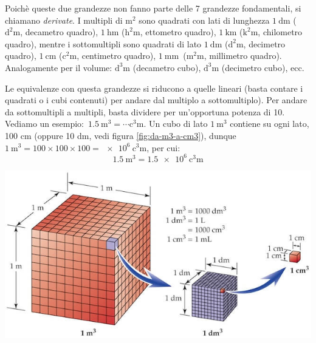 \documentclass[12pt,a4paper,oneside]{book}
\theoremstyle{esercizio}
\begin{document}
Poichè queste due grandezze non fanno parte delle 7 grandezze fondamentali, si chiamano \textit{derivate}. I multipli di \(\si{\square\meter}\) sono quadrati con lati di lunghezza \(\SI{1}{\deca\meter}\) (\(\si{\square\deca\meter}\), decametro quadro), \(\SI{1}{\hecto\meter}\) (\(\si{\square\hecto\meter}\), ettometro quadro), \(\SI{1}{\kilo\meter}\) (\(\si{\square\kilo\meter}\), chilometro quadro), mentre i sottomultipli sono quadrati di lato \(\SI{1}{\deci\meter}\) (\(\si{\square\deci\meter}\), decimetro quadro), \(\SI{1}{\centi\meter}\) (\(\si{\square\centi\meter}\), centimetro quadro), \(\SI{1}{\milli\meter}\)\ (\(\si{\square\milli\meter}\), millimetro quadro). Analogamente per il volume: \(\si{\cubic\deca\meter}\) (decametro cubo), \(\si{\cubic\deci\meter}\) (decimetro cubo), ecc.


Le  equivalenze con questa grandezze si riducono a quelle lineari (basta contare i quadrati o i cubi contenuti) per andare dal multiplo a sottomultiplo). Per andare da sottomultipli a  multipli, basta dividere per un'opportuna potenza di 10. Vediamo un esempio: \,$\SI{1,5}{\cubic\meter} = \cdots \si{\cubic\centi\meter}$. Un cubo di lato $\SI{1}{\cubic\meter}$ contiene su ogni lato, 100 cm (oppure 10 dm, vedi  figura \ref{fig:da-m3-a-cm3}), dunque $\SI{1}{\cubic\meter} = 100\times100\times100 = \SI{e+6}{\cubic\centi\meter}$, per cui:
\[
\SI{1,5}{\cubic\meter} = \SI{1,5e+6}{\cubic\centi\meter}
\]

\begin{minipage}{\linewidth}
	\centering
	\includegraphics[scale=0.5]{da-m3-a-cm3}
	\label{fig:da-m3-a-cm3}
\end{minipage}
\end{document}
